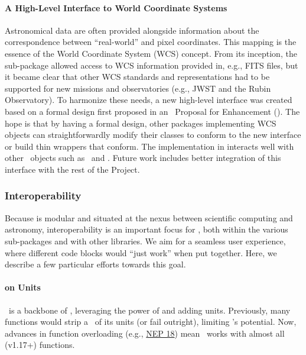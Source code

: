 \documentclass[modern]{aastex631}
\begin{document}
\paragraph{A High-Level Interface to World Coordinate Systems}
Astronomical data are often provided alongside information about the
correspondence between ``real-world'' and pixel coordinates. This mapping is the
essence of the World Coordinate System (WCS) concept. From its inception,
the  sub-package allowed access to WCS information provided
in, e.g., FITS files, but it became clear that other WCS standards and
representations had to be supported for new missions and observatories (e.g.,
JWST and the Rubin Observatory). To harmonize these
needs, a new high-level interface was created based on a formal design first
proposed in an \astropy\ Proposal for Enhancement (). The hope is
that by having a formal design, other packages implementing WCS objects can
straightforwardly modify their classes to conform to the new interface or build
thin wrappers that conform. The implementation in  interacts
well with other \astropypkg\ objects such as \astropySkyCoord\ and \astropyTime.
Future work includes better integration of this interface with the rest of
the Project.

\subsubsection{Interoperability} \label{sec:core-features-interoperability}

Because \astropy is modular and situated at the nexus between scientific
computing and astronomy, interoperability is an important focus for \astropy,
both within the various \astropypkg sub-packages and with other \python
libraries. We aim for a seamless user experience, where different code blocks
would ``just work'' when put together. Here, we describe a few particular
efforts towards this goal.

\paragraph{ on Units}

\astropyQuantity\ is a backbone of \astropy, leveraging the power of
 and adding units. Previously, many  functions
would strip a \astropyQuantity\ of its units (or fail outright), limiting
\astropyQuantity's potential. Now, advances in  function
overloading (e.g.,
\href{https://numpy.org/neps/nep-0018-array-function-protocol.html}{NEP 18})
mean \astropyQuantity\ works with almost all  (v1.17+)
functions.
\end{document}
